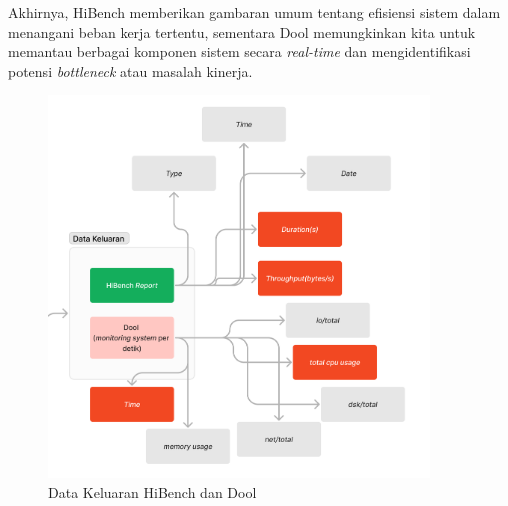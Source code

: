 Akhirnya, HiBench memberikan gambaran umum tentang efisiensi sistem dalam menangani beban kerja tertentu, sementara Dool memungkinkan kita untuk memantau berbagai komponen sistem secara\textit{ real-time} dan mengidentifikasi potensi \textit{bottleneck} atau masalah kinerja.

\begin{figure}[h]
    \centering
    \includegraphics[width=0.9\textwidth]{figures/ch02/output-hibench-dool.png}
    \caption{Data Keluaran HiBench dan Dool}
    \label{fig:output-hibench-dool}
\end{figure}

